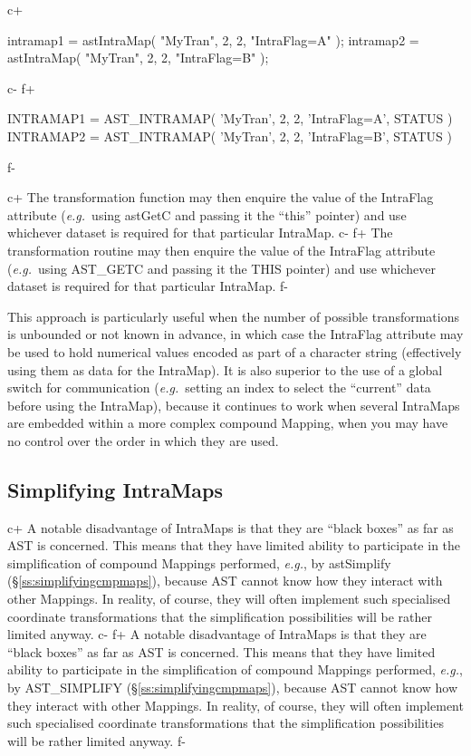 \documentclass[twoside,11pt]{starlink}
\providecommand{\secref}[1]{\S\ref{#1}}
\begin{document}
c+
\small
\begin{terminalv}
intramap1 = astIntraMap( "MyTran", 2, 2, "IntraFlag=A" );
intramap2 = astIntraMap( "MyTran", 2, 2, "IntraFlag=B" );
\end{terminalv}
\normalsize
c-
f+
\small
\begin{terminalv}
      INTRAMAP1 = AST_INTRAMAP( 'MyTran', 2, 2, 'IntraFlag=A', STATUS )
      INTRAMAP2 = AST_INTRAMAP( 'MyTran', 2, 2, 'IntraFlag=B', STATUS )
\end{terminalv}
\normalsize
f-

c+
The transformation function may then enquire the value of the IntraFlag
attribute (\emph{e.g.}\ using astGetC and passing it the ``this''
pointer) and use whichever dataset is required for that particular
IntraMap.
c-
f+
The transformation routine may then enquire the value of the IntraFlag
attribute (\emph{e.g.}\ using AST\_GETC and passing it the THIS
pointer) and use whichever dataset is required for that particular
IntraMap.
f-

This approach is particularly useful when the number of possible
transformations is unbounded or not known in advance, in which case
the IntraFlag attribute may be used to hold numerical values encoded
as part of a character string (effectively using them as data for the
IntraMap). It is also superior to the use of a global switch for
communication (\emph{e.g.}\ setting an index to select the ``current''
data before using the IntraMap), because it continues to work when
several IntraMaps are embedded within a more complex compound Mapping,
when you may have no control over the order in which they are used.

\subsection{\label{ss:simplifyingintramaps}Simplifying IntraMaps}

c+
A notable disadvantage of IntraMaps is that they are ``black boxes''
as far as AST is concerned. This means that they have limited ability
to participate in the simplification of compound Mappings performed,
\emph{e.g.}, by astSimplify (\secref{ss:simplifyingcmpmaps}), because
AST cannot know how they interact with other Mappings. In reality, of
course, they will often implement such specialised coordinate
transformations that the simplification possibilities will be rather
limited anyway.
c-
f+
A notable disadvantage of IntraMaps is that they are ``black boxes''
as far as AST is concerned. This means that they have limited ability
to participate in the simplification of compound Mappings performed,
\emph{e.g.}, by AST\_SIMPLIFY (\secref{ss:simplifyingcmpmaps}),
because AST cannot know how they interact with other Mappings. In
reality, of course, they will often implement such specialised
coordinate transformations that the simplification possibilities will
be rather limited anyway.
f-
\end{document}
